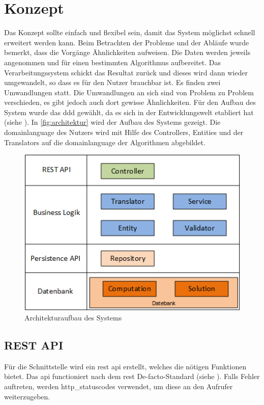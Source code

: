 \section{Konzept}\label{arch_backend}
Das Konzept sollte einfach und flexibel sein, damit das System möglichst schnell erweitert werden kann. Beim Betrachten der Probleme und der Abläufe wurde bemerkt, dass die Vorgänge 
Ähnlichkeiten aufweisen. Die Daten werden jeweils angenommen und für einen bestimmten Algorithmus aufbereitet. Das Verarbeitungssystem schickt das Resultat zurück und dieses wird dann 
wieder umgewandelt, so dass es für den Nutzer brauchbar ist. Es finden zwei Umwandlungen statt. Die Umwandlungen an sich sind von Problem zu Problem verschieden, es gibt jedoch 
auch dort gewisse Ähnlichkeiten. Für den Aufbau des System wurde das \gls{ddd} gewählt, da es sich in der Entwicklungswelt etabliert hat (siehe \cite{evans2004domain} 
\cite{soft_arch_book}). In \autoref{fig:architektur} wird der Aufbau des Systems gezeigt. Die  \gls{domainlanguage} des Nutzers wird mit Hilfe des Controllers, Entities und der Translators auf 
die \gls{domainlanguage} der Algorithmen abgebildet.

\begin{figure}[h]
\centering
\includegraphics[scale=0.8]{images/visio/architektur_db.png}
\caption[Architekturaufbau des Systems]{Architekturaufbau des Systems \selfmade{}}
\label{fig:architektur}
\end{figure}
 
\FloatBarrier
\subsection{REST API}
Für die Schnittstelle wird ein \gls{rest} \gls{api} erstellt, welches die nötigen Funktionen bietet. Das \gls{api} functioniert nach dem \gls{rest} De-facto-Standard 
(siehe \cite{masse2011rest}). Falls Fehler auftreten, werden \glspl{http_statuscode} verwendet, um diese an den Aufrufer weiterzugeben.

